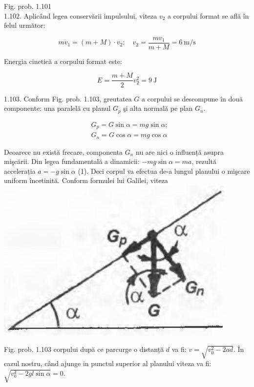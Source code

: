 \documentclass[10pt]{article}
\begin{document}
Fig. prob. 1.101\\
1.102. Aplicând legea conservării impulsului, viteza $v_{2}$ a corpului format se află în felul următor:

$$
m v_{1}=(m+M) \cdot v_{2} ; \quad v_{2}=\frac{m v_{1}}{m+M}=6 \mathrm{~m} / \mathrm{s}
$$

Energia cinetică a corpului format este:

$$
E=\frac{m+M}{2} v_{2}^{2}=9 \mathrm{~J}
$$

1.103. Conform Fig. prob. 1.103, greutatea $G$ a corpului se descompune în două componente: una paralelă cu planul $G_{p}$ şi alta normală pe plan $G_{n}$.

$$
\begin{aligned}
& G_{p}=G \sin \alpha=m g \sin \alpha ; \\
& G_{n}=G \cos \alpha=m g \cos \alpha
\end{aligned}
$$

Deoarece nu există frecare, componenta $G_{n}$ nu are nici o influență asupra mişcării. Din legea fundamentală a dinamicii: $-m g \sin \alpha=m a$, rezultă accelerația $a=-g \sin \alpha$ (1). Deci corpul va efectua de-a lungul planului o mişcare uniform încetinită. Conform formulei lui Galilei, viteza\\
\includegraphics[max width=\textwidth, center]{2025_07_01_5b3ff9fa0d508c8e9f17g-219(1)}

Fig. prob. 1.103 corpului după ce parcurge o distanță $d$ va fi: $v=\sqrt{v_{0}^{2}-2 a d}$. În cazul nostru, când ajunge in punctul superior al planului viteza va fi: $\sqrt{v_{0}^{2}-2 g l \sin \alpha}=0$.
\end{document}
